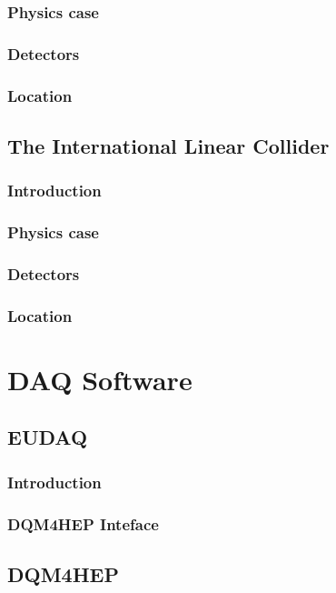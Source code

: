 \documentclass[]{article}
\begin{document}
\subsubsection{Physics case}
\subsubsection{Detectors}
\subsubsection{Location}

\subsection{The International Linear Collider}
\subsubsection{Introduction}
\subsubsection{Physics case}
\subsubsection{Detectors}
\subsubsection{Location}

\section{DAQ Software}

\subsection{EUDAQ}
\subsubsection{Introduction}
\subsubsection{DQM4HEP Inteface}

\subsection{DQM4HEP}
\end{document}
